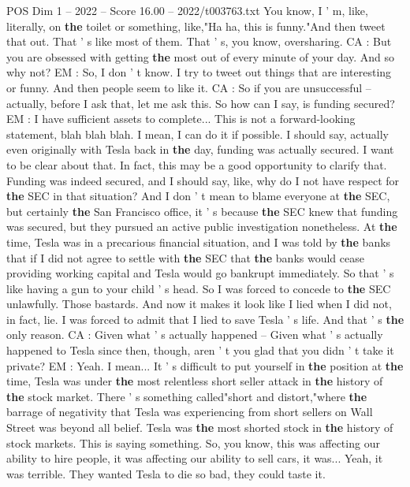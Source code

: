 \begin{textsample}{POS Dim 1 – 2022 – Score 16.00 – 2022/t003763.txt}
You know, I ' m, like, literally, on \textbf{the} toilet or something, like,"Ha ha, this is funny."And then tweet that out.
That ' s like most of them.
That ' s, you know, oversharing.
CA : But you are obsessed with getting \textbf{the} most out of every minute of your day.
And so why not?
EM : So, I don ' t know.
I try to tweet out things that are interesting or funny.
And then people seem to like it.
CA : So if you are unsuccessful -- actually, before I ask that, let me ask this.
So how can I say, is funding secured?
EM : I have sufficient assets to complete...
This is not a forward-looking statement, blah blah blah.
I mean, I can do it if possible.
I should say, actually even originally with Tesla back in \textbf{the} day, funding was actually secured.
I want to be clear about that.
In fact, this may be a good opportunity to clarify that.
Funding was indeed secured, and I should say, like, why do I not have respect for \textbf{the} SEC in that situation?
And I don ' t mean to blame everyone at \textbf{the} SEC, but certainly \textbf{the} San Francisco office, it ' s because \textbf{the} SEC knew that funding was secured, but they pursued an active public investigation nonetheless.
At \textbf{the} time, Tesla was in a precarious financial situation, and I was told by \textbf{the} banks that if I did not agree to settle with \textbf{the} SEC that \textbf{the} banks would cease providing working capital and Tesla would go bankrupt immediately.
So that ' s like having a gun to your child ' s head.
So I was forced to concede to \textbf{the} SEC unlawfully.
Those bastards.
And now it makes it look like I lied when I did not, in fact, lie.
I was forced to admit that I lied to save Tesla ' s life.
And that ' s \textbf{the} only reason.
CA : Given what ' s actually happened -- Given what ' s actually happened to Tesla since then, though, aren ' t you glad that you didn ' t take it private?
EM : Yeah.
I mean...
It ' s difficult to put yourself in \textbf{the} position at \textbf{the} time, Tesla was under \textbf{the} most relentless short seller attack in \textbf{the} history of \textbf{the} stock market.
There ' s something called"short and distort,"where \textbf{the} barrage of negativity that Tesla was experiencing from short sellers on Wall Street was beyond all belief.
Tesla was \textbf{the} most shorted stock in \textbf{the} history of stock markets.
This is saying something.
So, you know, this was affecting our ability to hire people, it was affecting our ability to sell cars, it was...
Yeah, it was terrible.
They wanted Tesla to die so bad, they could taste it.

\end{textsample}

